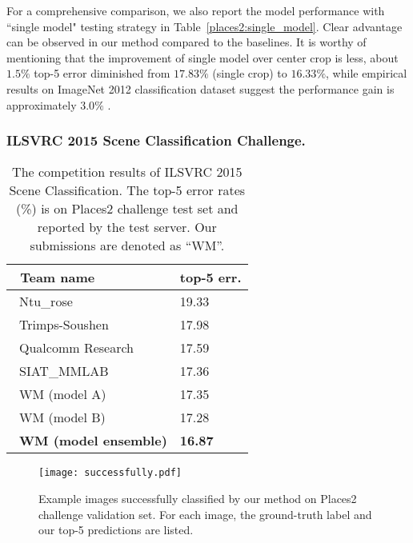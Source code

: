 \documentclass[runningheads]{llncs}
\begin{document}
For a comprehensive comparison, we also report the model performance with ``single model" testing strategy in Table~\ref{places2:single_model}. Clear advantage can be observed in our method compared to the baselines. It is worthy of mentioning that the improvement of single model over center crop is less, about $1.5\%$ top-5 error diminished from $17.83\%$ (single crop) to $16.33\%$, while empirical results on ImageNet 2012 classification dataset suggest the performance gain is approximately $3.0\%$ \cite{he_iccv2015,ioffe_2015}.

\subsubsection{ILSVRC 2015 Scene Classification Challenge.}

\begin{table}[t]
\setlength{\belowcaptionskip}{0pt}
\renewcommand\arraystretch{1.1}
\begin{center}
\begin{tabular}{p{4.5cm}|p{2.4cm}<{\centering}}
\hline
\ Team name & top-5 err. \\
\hline
\ Ntu\_rose & 19.33 \\
\ Trimps-Soushen & 17.98 \\
\ Qualcomm Research & 17.59 \\
\ SIAT\_MMLAB & 17.36 \\
\hline
\ WM (model A) & 17.35 \\
\ WM (model B) & 17.28 \\
\ \textbf{WM (model ensemble)} & \textbf{16.87} \\
\hline
\end{tabular}
\end{center}
\caption{The competition results of ILSVRC 2015 Scene Classification.
The top-5 error rates (\%) is on Places2 challenge test set and reported by the test server.
Our submissions are denoted as ``WM''.}
\label{places2:ILSVRC}
\end{table}

\begin{figure}[t]
\setlength{\abovecaptionskip}{0pt}
\begin{center}
\texttt{[image: successfully.pdf]}
\end{center}
\caption{Example images successfully classified by our method on Places2 challenge validation set.
For each image, the ground-truth label and our top-5 predictions are listed.}
\label{fig:successfully}
\end{figure}
\end{document}
